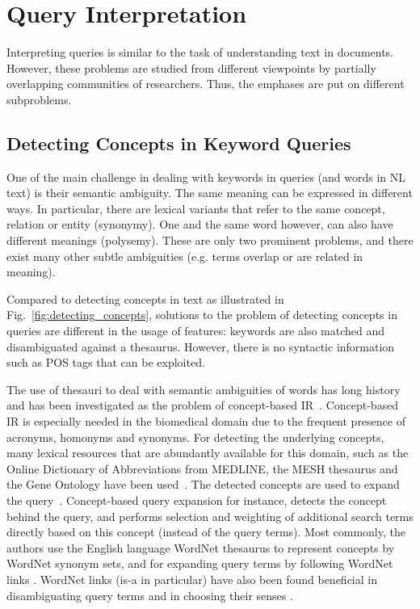 \section{Query Interpretation}\label{sec:query} 
	Interpreting queries is similar to the task of understanding text in documents. However, these problems are studied from different viewpoints by partially overlapping communities of researchers. Thus, the emphases are put on different subproblems. 
	
\subsection{Detecting Concepts in Keyword Queries} One of the main challenge in dealing with keywords in queries (and words in NL text) is their semantic ambiguity. The same meaning can be expressed in different ways. In particular, there are lexical variants that refer to the same concept, relation or entity (synonymy). One and the same word however, can also have different meanings (polysemy). These are only two prominent problems, and there exist many other subtle ambiguities (e.g. terms overlap or are related in meaning). 

Compared to detecting concepts in text as illustrated in Fig.~\ref{fig:detecting_concepts}, solutions to the problem of detecting concepts in queries are different in the usage of features: keywords are also matched and disambiguated against a thesaurus. However, there is no syntactic information such as POS tags that can be exploited. 

The use of thesauri to deal with semantic ambiguities of words has long history and has been investigated as the problem of concept-based IR~\cite{DBLP:conf/sigir/Giger88}. Concept-based IR is especially needed in the biomedical domain due to the frequent presence of acronyms, homonyms and synonyms. For detecting the underlying concepts, many lexical resources that are abundantly available for this domain, such as the Online Dictionary of Abbreviations from MEDLINE, the MESH thesaurus and the Gene Ontology have been used~\cite{DBLP:conf/sigir/ZhongH06}. The detected concepts are used to expand the query~\cite{DBLP:conf/sigir/QiuF93}. Concept-based query expansion \cite{DBLP:conf/sigir/QiuF93} for instance, detects the concept behind the query, and performs selection and weighting of additional search terms directly based on this concept (instead of the query terms). Most commonly, the authors use the English language WordNet thesaurus to represent concepts by WordNet synonym sets, and for expanding query terms by following WordNet links \cite{DBLP:conf/sigir/Voorhees93}. WordNet links (is-a in particular) have also been found beneficial in disambiguating query terms and in choosing their senses \cite{DBLP:conf/sigir/Voorhees94}. 

